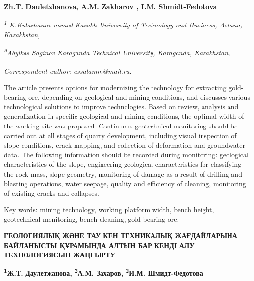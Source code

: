 
\begin{articleheader}

{\bfseries
Zh.T. Dauletzhanova\authorid,
A.M. Zakharov\textsuperscript{\envelope } \authorid,
I.M. Shmidt-Fedotova\authorid}
\end{articleheader}

\begin{affiliation}
\emph{\textsuperscript{1} K.Kulazhanov named Kazakh University of Technology and Business, Astana, Kazakhstan,}

\emph{\textsuperscript{2}Abylkas Saginov Karaganda Technical University, Karaganda, Kazakhstan,}

\raggedright \textsuperscript{\envelope }{\em Correspondent-author: \emph{assalamm@mail.ru.}}
\end{affiliation}

The article presents options for modernizing the technology for
extracting gold-bearing ore, depending on geological and mining
conditions, and discusses various technological solutions to improve
technologies. Based on review, analysis and generalization in specific
geological and mining conditions, the optimal width of the working site
was proposed. Continuous geotechnical monitoring should be carried out
at all stages of quarry development, including visual inspection of
slope conditions, crack mapping, and collection of deformation and
groundwater data. The following information should be recorded during
monitoring: geological characteristics of the slope,
engineering-geological characteristics for classifying the rock mass,
slope geometry, monitoring of damage as a result of drilling and
blasting operations, water seepage, quality and efficiency of cleaning,
monitoring of existing cracks and collapses.

Key words: mining technology, working platform width, bench height,
geotechnical monitoring, bench cleaning, gold-bearing ore.

\begin{articleheader}
{\bfseries ГЕОЛОГИЯЛЫҚ ЖӘНЕ ТАУ КЕН ТЕХНИКАЛЫҚ ЖАҒДАЙЛАРЫНА БАЙЛАНЫСТЫ ҚҰРАМЫНДА АЛТЫН БАР КЕНДІ АЛУ ТЕХНОЛОГИЯСЫН ЖАҢҒЫРТУ}

{\bfseries
\textsuperscript{1}Ж.Т. Даулетжанова,
\textsuperscript{2}А.М. Захаров\textsuperscript{\envelope },
\textsuperscript{2}И.М. Шмидт-Федотова}
\end{articleheader}


